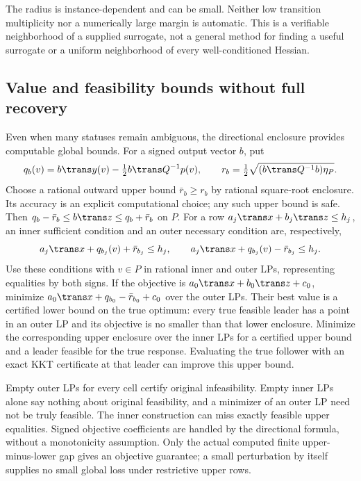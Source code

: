 The radius is instance-dependent and can be small. Neither low transition
multiplicity nor a numerically large margin is automatic. This is a
verifiable neighborhood of a supplied surrogate, not a general method
for finding a useful surrogate or a uniform neighborhood of every
well-conditioned Hessian.

\subsection{Value and feasibility bounds without full recovery}
\label{subsec:screening-bounds}

Even when many statuses remain ambiguous, the directional enclosure
provides computable global bounds. For a signed output vector $b$, put
\[
 q_b(v)=b\trans y(v)-\tfrac12b\trans Q^{-1}p(v),\qquad
 r_b=\tfrac12\sqrt{(b\trans Q^{-1}b)\eta_P}.
\]
Choose a rational outward upper bound $\bar r_b\ge r_b$ by rational
square-root enclosure. Its accuracy is an explicit computational choice;
any such upper bound is safe. Then
$q_b-\bar r_b\le b\trans z\le q_b+\bar r_b$ on $P$.
For a row $a_j\trans x+b_j\trans z\le h_j$, an inner sufficient
condition and an outer necessary condition are, respectively,
\begin{equation}\label{eq:screening-inner-outer}
 a_j\trans x+q_{b_j}(v)+\bar r_{b_j}\le h_j,\qquad
 a_j\trans x+q_{b_j}(v)-\bar r_{b_j}\le h_j.
\end{equation}
Use these conditions with $v\in P$ in rational inner and outer LPs,
representing equalities by both signs. If the objective is
$a_0\trans x+b_0\trans z+c_0$, minimize
$a_0\trans x+q_{b_0}-\bar r_{b_0}+c_0$ over the outer LPs.
Their best value is a certified lower bound on the true optimum:
every true feasible leader has a point in an outer LP and its objective
is no smaller than that lower enclosure. Minimize the corresponding
upper enclosure over the inner LPs for a certified upper bound and a
leader feasible for the true response. Evaluating the true follower
with an exact KKT certificate at that leader can improve this upper bound.

Empty outer LPs for every cell certify original infeasibility. Empty
inner LPs alone say nothing about original feasibility, and a minimizer
of an outer LP need not be truly feasible. The inner construction can
miss exactly feasible upper equalities. Signed objective coefficients
are handled by the directional formula, without a monotonicity
assumption. Only the actual computed finite upper-minus-lower gap gives
an objective guarantee; a small perturbation by itself supplies no
small global loss under restrictive upper rows.


